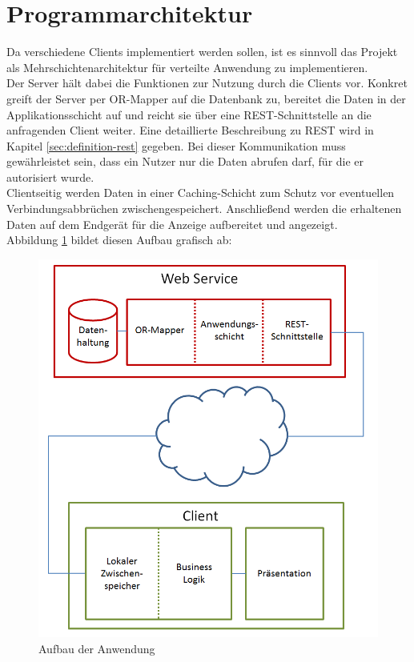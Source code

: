 \section{Programmarchitektur}
\label{sec:programmarchitektur}
Da verschiedene Clients implementiert werden sollen, ist es sinnvoll das Projekt als Mehrschichtenarchitektur für verteilte Anwendung zu implementieren. \\
Der Server hält dabei die Funktionen zur Nutzung durch die Clients vor. Konkret greift der Server per \gls{OR-Mapper} auf die Datenbank zu, bereitet die Daten in der Applikationsschicht auf und reicht sie über eine \ac{REST}-Schnittstelle an die anfragenden Client weiter. Eine detaillierte Beschreibung zu \ac{REST} wird in Kapitel \ref{sec:definition-rest} gegeben. Bei dieser Kommunikation muss gewährleistet sein, dass ein Nutzer nur die Daten abrufen darf, für die er autorisiert wurde. \\
Clientseitig werden Daten in einer Caching-Schicht zum Schutz vor eventuellen Verbindungsabbrüchen zwischengespeichert. Anschließend werden die erhaltenen Daten auf dem Endgerät für die Anzeige aufbereitet und angezeigt. \\
Abbildung \ref{pic:architecture} bildet diesen Aufbau grafisch ab:
\begin{figure}[h]
\centering
\includegraphics[width=0.7\linewidth]{content/images/Aufbau-Architektur.png}
\caption{Aufbau der Anwendung}
\label{pic:architecture}
\end{figure}

\newpage
